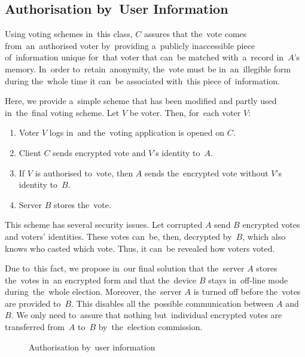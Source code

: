 \subsection{Authorisation by~User Information}
Using voting schemes in~this class, $C$ assures that the~vote comes from~an~authorised voter by~providing a~publicly inaccessible piece of~information unique for~that voter that can~be matched with~a~record in~$A$'s memory. In~order to~retain~anonymity, the~vote must be in~an~illegible form during the~whole time it can~be associated with~this piece of~information.

Here, we provide a~simple scheme that has been modified and partly used in~the~final voting scheme.
\bigbreak
Let $V$ be voter. Then, for~each voter $V$:
\begin{enumerate}
\item Voter $V$ logs in~and the~voting application is opened on $C$.
\item Client $C$ sends encrypted vote and $V$'s identity to~$A$.
\item If $V$ is authorised to~vote, then $A$ sends the~encrypted vote without $V$'s identity to~$B$.
\item Server $B$ stores the~vote. 
\end{enumerate}
This scheme has several security issues. Let corrupted $A$ send $B$ encrypted votes and voters' identities. These votes can~be, then, decrypted by~$B$, which also knows who casted which vote. Thus, it can~be revealed how voters voted.

Due to~this fact, we propose in~our final solution that the~server $A$ stores the~votes in~an encrypted form and that the~device $B$ stays in~off-line mode during~the~whole election. Moreover, the~server $A$ is turned off before the~votes are provided to~$B$. This disables all the~possible communication between $A$ and $B$. We only need to~assure that nothing but~individual encrypted votes are transferred from~$A$ to~$B$ by~the~election commission.
\begin{figure}[h]
\begin{center}
\caption{Authorisation by~user information}
\end{center}
\end{figure}










